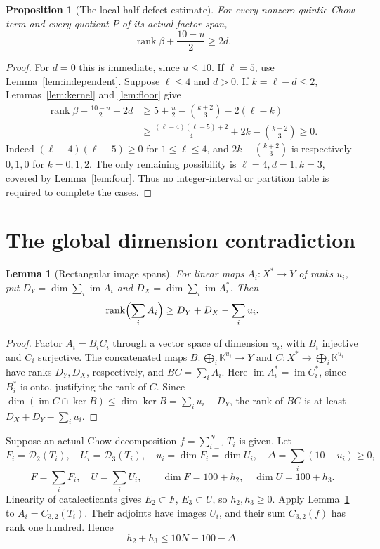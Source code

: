 \documentclass[11pt]{amsart}
\newtheorem{lemma}[theorem]{Lemma}
\newtheorem{proposition}[theorem]{Proposition}
\theoremstyle{remark}
\numberwithin{equation}{section}
\newcommand{\K}{\mathbb K}
\newcommand{\im}{\operatorname{im}}
\newcommand{\rank}{\operatorname{rank}}
\newcommand{\cD}{\mathcal D}
\begin{document}
\begin{proposition}[The local half-defect estimate]\label{prop:local}
For every nonzero quintic Chow term and every quotient \(P\) of its
actual factor span,
\begin{equation}\label{eq:local}
 \boxed{\rank\beta+\frac{10-u}{2}\ge2d.}
\end{equation}
\end{proposition}
\begin{proof}
For \(d=0\) this is immediate, since \(u\le10\).
If \(\ell=5\), use Lemma~\ref{lem:independent}.
Suppose \(\ell\le4\) and \(d>0\). If \(k=\ell-d\le2\),
Lemmas~\ref{lem:kernel} and \ref{lem:floor} give
\begin{align*}
 \rank\beta+\frac{10-u}{2}-2d
 &\ge5+\frac{u}{2}-\binom{k+2}{3}-2(\ell-k)\\
 &\ge\frac{(\ell-4)(\ell-5)+2}{4}
       +2k-\binom{k+2}{3}\ge0.
\end{align*}
Indeed \((\ell-4)(\ell-5)\ge0\) for \(1\le\ell\le4\), and
\(2k-\binom{k+2}{3}\) is respectively \(0,1,0\) for \(k=0,1,2\).
The only remaining possibility is \(\ell=4,d=1,k=3\), covered by
Lemma~\ref{lem:four}. Thus no integer-interval or partition table is
required to complete the cases.
\end{proof}

\section{The global dimension contradiction}
\begin{lemma}[Rectangular image spans]\label{lem:rectangular}
For linear maps \(A_i:X^*\to Y\) of ranks \(u_i\), put
\(D_Y=\dim\sum_i\im A_i\) and \(D_X=\dim\sum_i\im A_i^*\).
Then
\[
 \rank\Bigl(\sum_iA_i\Bigr)\ge D_Y+D_X-\sum_i u_i.
\]
\end{lemma}
\begin{proof}
Factor \(A_i=B_iC_i\) through a vector space of dimension \(u_i\),
with \(B_i\) injective and \(C_i\) surjective. The concatenated maps
\(B:\bigoplus_i\K^{u_i}\to Y\) and
\(C:X^*\to\bigoplus_i\K^{u_i}\) have ranks \(D_Y,D_X\), respectively,
and \(BC=\sum_iA_i\). Here \(\im A_i^*=\im C_i^*\), since
\(B_i^*\) is onto, justifying the rank of \(C\). Since
\(\dim(\im C\cap\ker B)\le\dim\ker B=\sum_i u_i-D_Y\), the
rank of \(BC\) is at least \(D_X+D_Y-\sum_i u_i\).
\end{proof}

Suppose an actual Chow decomposition \(f=\sum_{i=1}^N T_i\) is given.
Let
\[
 F_i=\cD_2(T_i),\quad U_i=\cD_3(T_i),\quad
 u_i=\dim F_i=\dim U_i,\quad \Delta=\sum_i(10-u_i)\ge0,
\]
\[
 F=\sum_iF_i,\quad U=\sum_iU_i,\qquad
 \dim F=100+h_2,\quad\dim U=100+h_3.
\]
Linearity of catalecticants gives \(E_2\subset F\), \(E_3\subset U\),
so \(h_2,h_3\ge0\). Apply Lemma~\ref{lem:rectangular} to
\(A_i=C_{3,2}(T_i)\). Their adjoints have images \(U_i\), and their
sum \(C_{3,2}(f)\) has rank one hundred. Hence
\begin{equation}\label{eq:upper}
 h_2+h_3\le10N-100-\Delta.
\end{equation}
\end{document}
